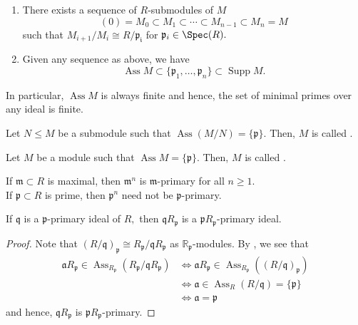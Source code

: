 \documentclass[12pt]{article}	%
\DeclareMathOperator{\Ass}{Ass}
\DeclareMathOperator{\Supp}{Supp}
\begin{document}
\begin{thm}
	\begin{enumerate}
		\item There exists a sequence of $R$-submodules of $M$
		\begin{equation*} 
			(0) = M_0 \subset M_1 \subset \cdots \subset M_{n-1} \subset M_n = M
		\end{equation*}
		such that $M_{i+1}/M_i \cong R/\mathfrak{p_i}$ for $\mathfrak{p}_i \in \Spec(R).$
		\item Given any sequence as above, we have
		\begin{equation*} 
			\Ass M \subset \{\mathfrak{p}_1, \ldots, \mathfrak{p}_n\} \subset \Supp M.
		\end{equation*}
	\end{enumerate}
	In particular, $\Ass M$ is always finite and hence, the set of minimal primes over any ideal is finite.
\end{thm}

\begin{defn}%
	Let $N \le M$ be a submodule such that $\Ass(M/N) = \{\mathfrak{p}\}.$ Then, $M$ is called .
\end{defn}
\begin{defn}%
	Let $M$ be a module such that $\Ass M = \{\mathfrak{p}\}.$ Then, $M$ is called .
\end{defn}

\begin{ex}
	If $\mathfrak{m} \subset R$ is maximal, then $\mathfrak{m}^n$ is $\mathfrak{m}$-primary for all $n \ge 1.$\\
	If $\mathfrak{p} \subset R$ is prime, then $\mathfrak{p}^n$ need not be $\mathfrak{p}$-primary.
\end{ex}

\begin{prop}
	If $\mathfrak{q}$ is a $\mathfrak{p}$-primary ideal of $R,$ then $\mathfrak{q}R_{\mathfrak{p}}$ is a $\mathfrak{p}R_{\mathfrak{p}}$-primary ideal.
\end{prop}
\begin{proof} 
	Note that $(R/\mathfrak{q})_{\mathfrak{p}} \cong R_{\mathfrak{p}}/\mathfrak{q}R_{\mathfrak{p}}$ as $\mathbb{R}_{\mathfrak{p}}$-modules. By , we see that
	\begin{align*} 
		\mathfrak{a}R_{\mathfrak{p}} \in \Ass_{R_{\mathfrak{p}}}(R_{\mathfrak{p}}/\mathfrak{q}R_{\mathfrak{p}}) &\iff \mathfrak{a}R_{\mathfrak{p}} \in \Ass_{R_{\mathfrak{p}}}\left((R/\mathfrak{q})_{\mathfrak{p}}\right)\\
		&\iff \mathfrak{a} \in \Ass_R(R/\mathfrak{q}) = \{\mathfrak{p}\}\\
		&\iff \mathfrak{a} = \mathfrak{p}
	\end{align*}
	and hence, $\mathfrak{q}R_{\mathfrak{p}}$ is $\mathfrak{p}R_{\mathfrak{p}}$-primary.
\end{proof}
\end{document}

